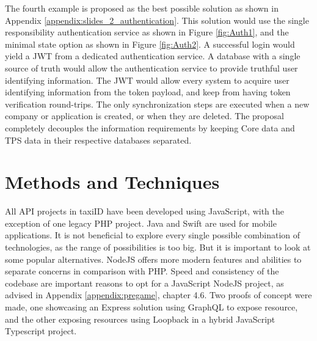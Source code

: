 The fourth example is proposed as the best possible solution as shown in Appendix \ref{appendix:slides_2_authentication}. This solution would use the single responsibility authentication service as shown in Figure \ref{fig:Auth1}, and the minimal state option as shown in Figure \ref{fig:Auth2}. A successful login would yield a JWT from a dedicated authentication service. A database with a single source of truth would allow the authentication service to provide truthful user identifying information. The JWT would allow every system to acquire user identifying information from the token payload, and keep from having token verification round-trips. The only synchronization steps are executed when a new company or application is created, or when they are deleted. The proposal completely decouples the information requirements by keeping Core data and TPS data in their respective databases separated.

%
\section{Methods and Techniques}
All API projects in taxiID have been developed using JavaScript, with the exception of one legacy PHP project. Java and Swift are used for mobile applications. It is not beneficial to explore every single possible combination of technologies, as the range of possibilities is too big. But it is important to look at some popular alternatives. NodeJS offers more modern features and abilities to separate concerns in comparison with PHP. Speed and consistency of the codebase are important reasons to opt for a JavaScript NodeJS project, as advised in Appendix \ref{appendix:pregame}, chapter 4.6. Two proofs of concept were made, one showcasing an Express solution using GraphQL to expose resource, and the other exposing resources using Loopback in a hybrid JavaScript Typescript project.

